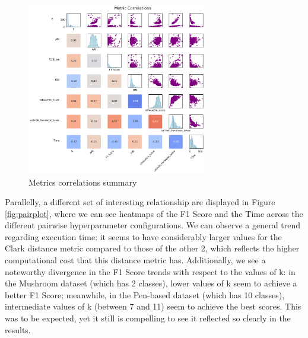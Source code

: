 \begin{figure}[h]
    \centering
    \includegraphics[width=0.7\textwidth]{figures/metrics_correlations_matrix.png}
    \caption{Metrics correlations summary}
    \label{fig:metrics_corr}
\end{figure}

Parallelly, a different set of interesting relationship are displayed in Figure \ref{fig:pairplot}, where we can see heatmaps of the F1 Score and the Time across the different pairwise hyperparameter configurations. We can observe a general trend regarding execution time: it seems to have considerably larger values for the Clark distance metric compared to those of the other 2, which reflects the higher computational cost that this distance metric has. Additionally, we see a noteworthy divergence in the F1 Score trends with respect to the values of k: in the Mushroom dataset (which has 2 classes), lower values of k seem to achieve a better F1 Score; meanwhile, in the Pen-based dataset (which has 10 classes), intermediate values of k (between 7 and 11) seem to achieve the best scores. This was to be expected, yet it still is compelling to see it reflected so clearly in the results. 

